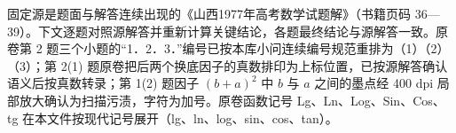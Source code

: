 

\begin{gktip}
固定源是题面与解答连续出现的《山西1977年高考数学试题解》（书籍页码 36—39）。下文逐题对照源解答并重新计算关键结论，各题最终结论与源解答一致。原卷第 2 题三个小题的“1．2．3．”编号已按本库小问连续编号规范重排为（1）（2）（3）；第 2(1) 题原卷把后两个换底因子的真数排印为上标位置，已按源解答确认语义后按真数转录；第 1(2) 题因子 $(b+a)^2$ 中 $b$ 与 $a$ 之间的墨点经 400 dpi 局部放大确认为扫描污渍，字符为加号。原卷函数记号 Lg、Ln、Log、Sin、Cos、tg 在本文件按现代记号展开（lg、ln、log、sin、cos、tan）。
\end{gktip}

